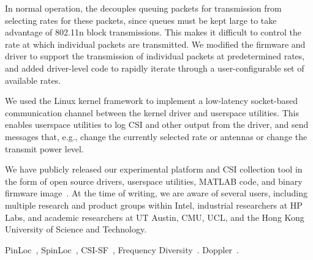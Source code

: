  In normal operation, the  decouples queuing packets for transmission from selecting rates for these packets, since queues must be kept large to take advantage of 802.11n block transmissions. This makes it difficult to control the rate at which individual packets are transmitted. We modified the firmware and driver to support the transmission of individual packets at predetermined rates, and added driver-level code to rapidly iterate through a user-configurable set of available rates.

 We used the Linux kernel  framework to implement a low-latency socket-based communication channel between the kernel driver and userspace utilities. This enables userspace utilities to log CSI and other output from the driver, and send messages that, e.g., change the currently selected rate or antennas or change the transmit power level.

 We have publicly released our experimental platform and CSI collection tool in the form of open source drivers, userspace utilities, MATLAB code, and binary firmware image~\cite{Halperin_csitool}. At the time of writing, we are aware of several users, including multiple research and product groups within Intel, industrial researchers at HP Labs, and academic researchers at UT Austin, CMU, UCL, and the Hong Kong University of Science and Technology.

 PinLoc~\cite{Sen_PinLoc}, SpinLoc~\cite{Sen_SpinLoc}, CSI-SF~\cite{Crepaldi_CSI_SF}, Frequency Diversity~\cite{Bhartia_FreqDiv}. Doppler~\cite{Perahia_Doppler}.

\ifx\mainfile\undefined

\fi
